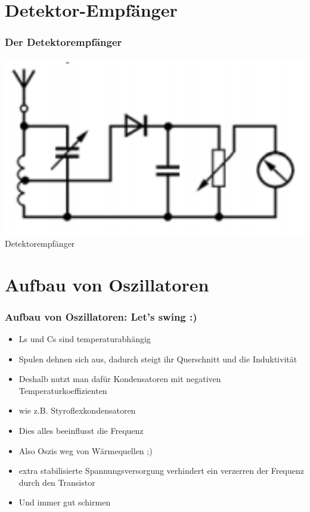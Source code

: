 \section*{Detektor-Empfänger}
\begin{frame}
\frametitle{Der Detektorempfänger}
    \begin{center}
        \includegraphics[width=1\textwidth]{a17/TJ601.png}\\
       Detektorempfänger \cite{bna}
    \end{center}
\end{frame}

\section*{Aufbau von Oszillatoren}
\begin{frame}
\frametitle{Aufbau von Oszillatoren: Let's swing :)}
\begin{itemize}
	\item	Ls und Cs sind temperaturabhängig
	\item	Spulen dehnen sich aus, dadurch steigt ihr Querschnitt und die Induktivität
	\item	Deshalb nutzt man dafür Kondensatoren mit negativen Temperaturkoeffizienten
	\item	wie z.B. Styroflexkondensatoren
	\item	Dies alles beeinflusst die Frequenz
	\item	Also Oszis weg von Wärmequellen ;)
	\item	extra stabilisierte Spannungsversorgung verhindert ein verzerren der Frequenz durch den Transistor
	\item	Und immer gut schirmen
\end{itemize}
\end{frame}

